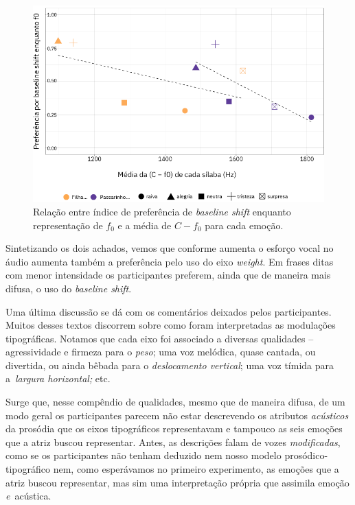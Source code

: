 \documentclass[a4paper]{tufte-handout}
\begin{document}
\begin{figure}
  \hspace*{-0.53cm}  
  \includegraphics[width=1.03\textwidth]{imgs/baseline_shift--f0.png}
  \caption{Relação entre índice de preferência de \textit{baseline shift} enquanto representação de $f_0$ e a média de $C-f_0$ para cada emoção.}
  \label{baseline_shift_as_f0}
\end{figure}

Sintetizando os dois achados, vemos que conforme aumenta o esforço vocal no áudio aumenta também a preferência pelo uso do eixo \textit{weight}. Em frases ditas com menor intensidade os participantes preferem, ainda que de maneira mais difusa, o uso do \textit{baseline shift}.

Uma última discussão se dá com os comentários deixados pelos participantes. Muitos desses textos discorrem sobre como foram interpretadas as modulações tipográficas. Notamos que cada eixo foi associado a diversas qualidades -- agressividade e firmeza para o \textit{peso}; uma voz melódica, quase cantada, ou divertida, ou ainda bêbada para o \textit{deslocamento vertical}; uma voz tímida para a~\textit{largura horizontal;} etc. 

Surge que, nesse compêndio de qualidades, mesmo que de maneira difusa, de um modo geral os participantes parecem não estar descrevendo os atributos \textit{acústicos} da prosódia que os eixos tipográficos representavam e tampouco as seis emoções que a atriz buscou representar. Antes, as descrições falam de vozes \textit{modificadas}, como se os participantes não tenham deduzido nem nosso modelo prosódico-tipográfico nem, como esperávamos no primeiro experimento, as emoções que a atriz buscou representar, mas sim uma interpretação própria que assimila emoção \textit{e}~acústica.
\end{document}
